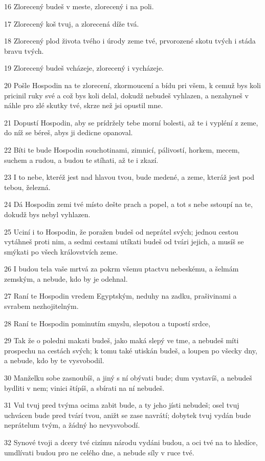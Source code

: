 \par 16 Zlorecený budeš v meste, zlorecený i na poli.
\par 17 Zlorecený koš tvuj, a zlorecená díže tvá.
\par 18 Zlorecený plod života tvého i úrody zeme tvé, prvorozené skotu tvých i stáda bravu tvých.
\par 19 Zlorecený budeš vcházeje, zlorecený i vycházeje.
\par 20 Pošle Hospodin na te zlorecení, zkormoucení a bídu pri všem, k cemuž bys koli pricinil ruky své a což bys koli delal, dokudž nebudeš vyhlazen, a nezahyneš v náhle pro zlé skutky tvé, skrze než jsi opustil mne.
\par 21 Dopustí Hospodin, aby se prídržely tebe morní bolesti, až te i vypléní z zeme, do níž se béreš, abys ji dedicne opanoval.
\par 22 Bíti te bude Hospodin souchotinami, zimnicí, pálivostí, horkem, mecem, suchem a rudou, a budou te stíhati, až te i zkazí.
\par 23 I to nebe, kteréž jest nad hlavou tvou, bude medené, a zeme, kteráž jest pod tebou, železná.
\par 24 Dá Hospodin zemi tvé místo dešte prach a popel, a tot s nebe sstoupí na te, dokudž bys nebyl vyhlazen.
\par 25 Uciní i to Hospodin, že poražen budeš od neprátel svých; jednou cestou vytáhneš proti nim, a sedmi cestami utíkati budeš od tvári jejich, a musíš se smýkati po všech královstvích zeme.
\par 26 I budou tela vaše mrtvá za pokrm všemu ptactvu nebeskému, a šelmám zemským, a nebude, kdo by je odehnal.
\par 27 Raní te Hospodin vredem Egyptským, neduhy na zadku, prašivinami a svrabem nezhojitelným.
\par 28 Raní te Hospodin pominutím smyslu, slepotou a tupostí srdce,
\par 29 Tak že o poledni makati budeš, jako maká slepý ve tme, a nebudeš míti prospechu na cestách svých; k tomu také utiskán budeš, a loupen po všecky dny, a nebude, kdo by te vysvobodil.
\par 30 Manželku sobe zasnoubíš, a jiný s ní obývati bude; dum vystavíš, a nebudeš bydliti v nem; vinici štípíš, a sbírati na ní nebudeš.
\par 31 Vul tvuj pred tvýma ocima zabit bude, a ty jeho jísti nebudeš; osel tvuj uchvácen bude pred tvárí tvou, anižt se zase navrátí; dobytek tvuj vydán bude neprátelum tvým, a žádný ho nevysvobodí.
\par 32 Synové tvoji a dcery tvé cizímu národu vydáni budou, a oci tvé na to hledíce, umdlívati budou pro ne celého dne, a nebude síly v ruce tvé.
